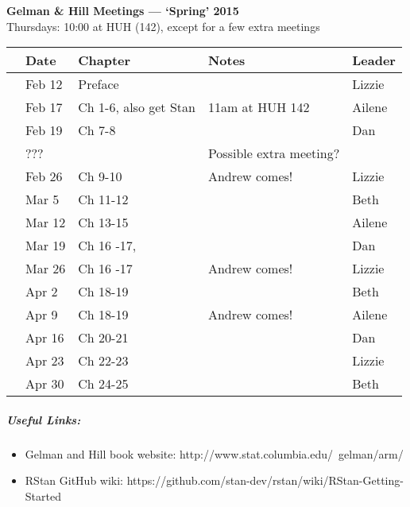 \documentclass[11pt]{article}
\newenvironment{smitemize}{
\begin{itemize}
  \setlength{\itemsep}{0pt}
  \setlength{\parskip}{0.8pt}
  \setlength{\parsep}{0pt}}
{\end{itemize}
}
\begin{document}
 
\raggedright
{}

\begin{center} 
{\large \textbf{Gelman \& Hill Meetings --- `Spring' 2015}} \\ [2pt]
Thursdays: 10:00 at HUH (142), except for a few extra meetings\\
\end{center} 

\begin{center}
\begin{tabular}{ p{0.7 cm}  p{1.5 cm}  p{5 cm}  p{5 cm}  p{1.5 cm} }  \hline \hline
 & \textbf{Date}
   & \textbf{Chapter}
      & \textbf{Notes} 
         & \textbf{Leader} \\ 
\hline \hline
 & Feb 12  &  Preface&        & Lizzie \\\hline
 & Feb 17  & Ch 1-6, also get Stan   &  11am at HUH 142 & Ailene  \\\hline
 & Feb 19  & Ch 7-8 &      & Dan \\\hline
 & ???  &  &  Possible extra meeting?     &  \\\hline
 & Feb 26 & Ch 9-10 &  Andrew comes! & Lizzie  \\\hline
 & Mar 5 & Ch 11-12 &        & Beth   \\\hline
 & Mar 12 & Ch 13-15 &  & Ailene \\\hline
 & Mar 19 & Ch 16 -17, &        & Dan \\\hline
 & Mar 26 & Ch 16 -17 &  Andrew comes! & Lizzie  \\\hline
 & Apr 2& Ch 18-19   &  & Beth  \\\hline
 & Apr 9 & Ch 18-19   &  Andrew comes!& Ailene  \\\hline
 & Apr 16 &Ch 20-21 &  & Dan  \\\hline
 & Apr 23 & Ch 22-23       & & Lizzie \\\hline
 & Apr 30& Ch 24-25  & & Beth\\\hline
\hline
\end{tabular}
\end{center}
\subparagraph{Useful Links:} 
\begin{smitemize}
\item Gelman and Hill book website: http://www.stat.columbia.edu/~gelman/arm/
\item RStan GitHub wiki: https://github.com/stan-dev/rstan/wiki/RStan-Getting-Started
\end{smitemize}
\end{document}
